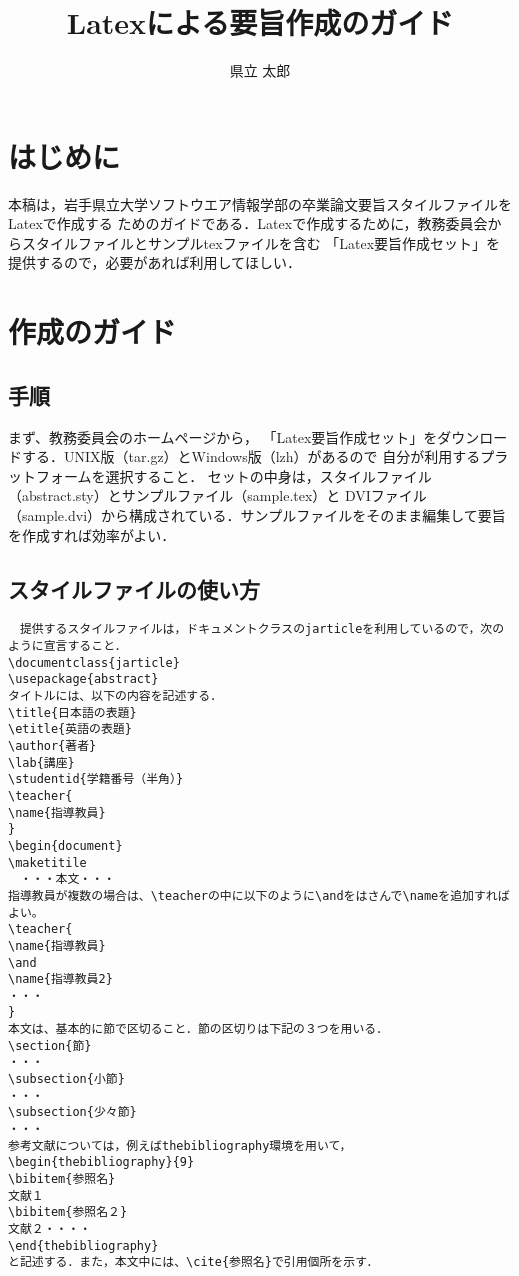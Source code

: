 \documentclass[twocolumn,a4paper,uplatex,dvipdfmx]{jarticle}
\title{Latexによる要旨作成のガイド}
\author{県立 太郎}
\begin{document}
\maketitle
\section{はじめに}
本稿は，岩手県立大学ソフトウエア情報学部の卒業論文要旨スタイルファイルをLatex\cite{bibunsho}で作成する
ためのガイドである．Latexで作成するために，教務委員会からスタイルファイルとサンプルtexファイルを含む
「Latex要旨作成セット」を提供するので，必要があれば利用してほしい．
\section{作成のガイド}
\subsection{手順}
まず、教務委員会のホームページから，
「Latex要旨作成セット」をダウンロードする．UNIX版（tar.gz）とWindows版（lzh）があるので
自分が利用するプラットフォームを選択すること．
セットの中身は，スタイルファイル（abstract.sty）とサンプルファイル（sample.tex）と
DVIファイル（sample.dvi）から構成されている．サンプルファイルをそのまま編集して要旨を作成すれば効率がよい．
\subsection{スタイルファイルの使い方}
\begin{verbatim}
　提供するスタイルファイルは，ドキュメントクラスのjarticleを利用しているので，次のように宣言すること．
\documentclass{jarticle}
\usepackage{abstract}
タイトルには、以下の内容を記述する．
\title{日本語の表題}
\etitle{英語の表題}
\author{著者}
\lab{講座}
\studentid{学籍番号（半角）}
\teacher{
\name{指導教員}
}
\begin{document}
\maketitile
　・・・本文・・・
指導教員が複数の場合は、\teacherの中に以下のように\andをはさんで\nameを追加すればよい。
\teacher{
\name{指導教員}
\and
\name{指導教員2}
・・・
}
本文は、基本的に節で区切ること．節の区切りは下記の３つを用いる．
\section{節}
・・・
\subsection{小節}
・・・
\subsection{少々節}
・・・
参考文献については，例えばthebibliography環境を用いて，
\begin{thebibliography}{9}
\bibitem{参照名}
文献１
\bibitem{参照名２}
文献２・・・・
\end{thebibliography}
と記述する．また，本文中には、\cite{参照名}で引用個所を示す．
\end{verbatim}
\end{document}
